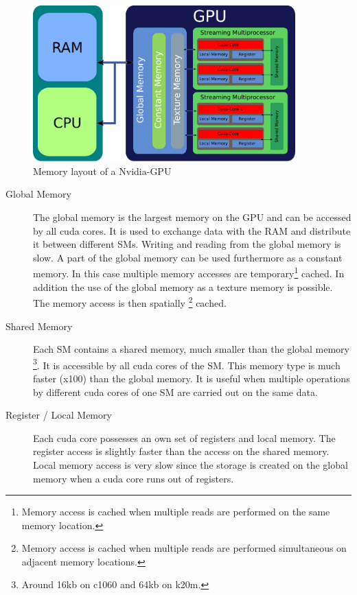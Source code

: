 \begin{figure}[!tbp]
      \centering
        \includegraphics[width=0.9\textwidth]{gfx/cuda/gpu.pdf}
          \caption{Memory layout of a Nvidia-GPU}
    \label{fig:gpu_memory_layout}
\end{figure}

\begin{description}
    \item[Global Memory] The global memory is the largest memory on the GPU and can be accessed by all cuda cores.
                         It is  used to exchange data with the RAM and distribute it between different SMs.
                         Writing and reading from the global memory is slow. A part of the global memory can be used furthermore  as a constant memory.
                         In this case multiple memory accesses  are temporary\footnote{Memory access is cached when multiple reads are performed on the same memory location.}
                          cached.
                         In addition the use of the global memory as a texture memory is possible. The memory access is then spatially
                         \footnote{Memory access is cached when multiple reads are performed simultaneous on adjacent memory locations.} cached.

    \item[Shared Memory] Each SM contains a shared memory, much smaller than the global memory \footnote{Around 16kb on c1060 and 64kb on k20m.}. It is accessible
                         by all cuda cores of the SM.
                         This memory type is much faster (x100) than the global memory. It is useful when multiple operations
                         by different cuda cores of one SM are carried out on the same data.

    \item[Register / Local Memory] Each cuda core possesses an own set of registers and local memory.
                                   The register access is slightly faster than the access  on the shared memory.
                                   Local memory access is very slow since the storage is
                                    created on the global memory when a cuda core runs out of registers.
\end{description}

